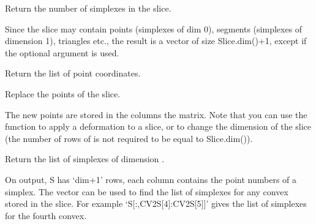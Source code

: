 \documentclass[a4paper,11pt,english]{sphinxmanual}
\begin{document}
\begin{fulllineitems}
\begin{fulllineitems}
\end{fulllineitems}


\begin{fulllineitems}
\label{\detokenize{python/cmdref_Slice:getfem.Slice.nbsplxs}}
Return the number of simplexes in the slice.

Since the slice may contain points (simplexes of dim 0), segments
(simplexes of dimension 1), triangles etc., the result is a vector
of size Slice.dim()+1, except if the optional argument 
is used.

\end{fulllineitems}


\begin{fulllineitems}
\label{\detokenize{python/cmdref_Slice:getfem.Slice.pts}}
Return the list of point coordinates.

\end{fulllineitems}


\begin{fulllineitems}
\label{\detokenize{python/cmdref_Slice:getfem.Slice.set_pts}}
Replace the points of the slice.

The new points  are stored in the columns the matrix. Note that
you can use the function to apply a deformation to a slice, or to
change the dimension of the slice (the number of rows of  is not
required to be equal to Slice.dim()).

\end{fulllineitems}


\begin{fulllineitems}
\label{\detokenize{python/cmdref_Slice:getfem.Slice.splxs}}
Return the list of simplexes of dimension .

On output, S has ‘dim+1’ rows, each column contains the point
numbers of a simplex.  The vector  can be used to find the
list of simplexes for any convex stored in the slice. For example
‘S{[}:,CV2S{[}4{]}:CV2S{[}5{]}{]}’
gives the list of simplexes for the fourth convex.

\end{fulllineitems}


\end{fulllineitems}
\end{document}
